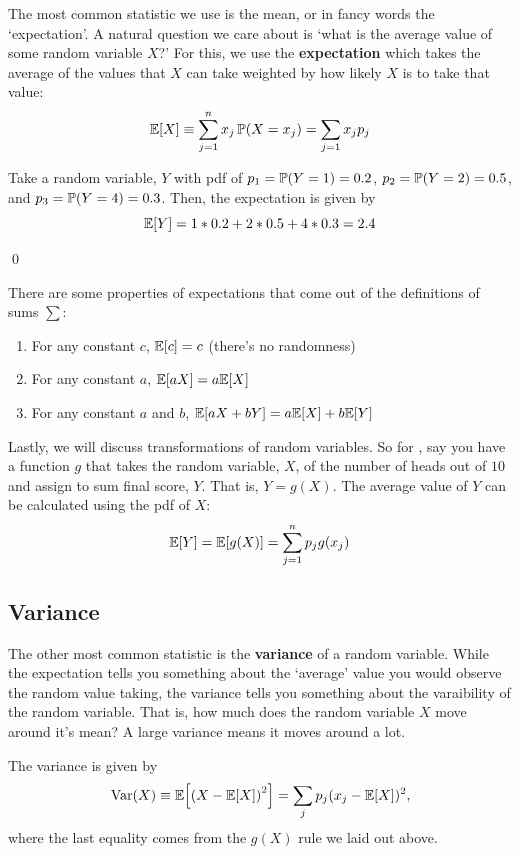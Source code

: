 \documentclass[12pt]{article}
\begin{document}
The most common statistic we use is the mean, or in fancy words the `expectation'. A natural question we care about is `what is the average value of some random variable $X$?' For this, we use the \textbf{expectation} which takes the average of the values that $X$ can take weighted by how likely $X$ is to take that value:
$$
  \expec{X} \equiv \sum_{j=1}^n x_j \P(X = x_j) = \sum_{j=1} x_j p_j
$$

\begin{example}
  Take a random variable, $Y$ with pdf of $p_1 = \P{Y = 1} = 0.2$, $p_2 = \P{Y = 2} = 0.5$, and $p_3 = \P{Y = 4} = 0.3$. Then, the expectation is given by
  $$
    \expec{Y} = 1 * 0.2 + 2 * 0.5 + 4 * 0.3 = 2.4
  $$

  \qed
\end{example}

There are some properties of expectations that come out of the definitions of sums $\sum$:
\begin{enumerate}
  \item For any constant $c$, $\expec{c} = c$ (there's no randomness)
  \item For any constant $a$, $\expec{aX} = a \expec{X}$
  \item For any constant $a$ and $b$, $\expec{aX + bY} = a \expec{X} + b \expec{Y}$
\end{enumerate}

Lastly, we will discuss transformations of random variables. So for , say you have a function $g$ that takes the random variable, $X$, of the number of heads out of $10$ and assign to sum final score, $Y$. That is, $Y = g(X)$. The average value of $Y$ can be calculated using the pdf of $X$:
$$
  \expec{Y} = \expec{g(X)} = \sum_{j=1}^n p_j g(x_j)
$$

\subsection*{Variance}

The other most common statistic is the \textbf{variance} of a random variable. While the expectation tells you something about the `average' value you would observe the random value taking, the variance tells you something about the varaibility of the random variable. That is, how much does the random variable $X$ move around it's mean? A large variance means it moves around a lot.

The variance is given by
$$
  \var{X} \equiv \expec{\left( X - \expec{X} \right)^2 } = \sum_j p_j (x_j - \expec{X})^2,
$$
where the last equality comes from the $g(X)$ rule we laid out above.
\end{document}
